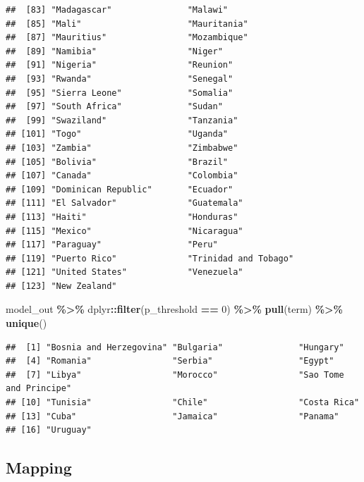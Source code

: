 \documentclass[
]{book}
\newenvironment{Shaded}{\begin{snugshade}}{\end{snugshade}}
\newcommand{\DecValTok}[1]{\textcolor[rgb]{0.00,0.00,0.81}{#1}}
\newcommand{\FunctionTok}[1]{\textcolor[rgb]{0.13,0.29,0.53}{\textbf{#1}}}
\newcommand{\NormalTok}[1]{#1}
\newcommand{\SpecialCharTok}[1]{\textcolor[rgb]{0.81,0.36,0.00}{\textbf{#1}}}
\begin{document}
\begin{verbatim}
##  [83] "Madagascar"               "Malawi"                  
##  [85] "Mali"                     "Mauritania"              
##  [87] "Mauritius"                "Mozambique"              
##  [89] "Namibia"                  "Niger"                   
##  [91] "Nigeria"                  "Reunion"                 
##  [93] "Rwanda"                   "Senegal"                 
##  [95] "Sierra Leone"             "Somalia"                 
##  [97] "South Africa"             "Sudan"                   
##  [99] "Swaziland"                "Tanzania"                
## [101] "Togo"                     "Uganda"                  
## [103] "Zambia"                   "Zimbabwe"                
## [105] "Bolivia"                  "Brazil"                  
## [107] "Canada"                   "Colombia"                
## [109] "Dominican Republic"       "Ecuador"                 
## [111] "El Salvador"              "Guatemala"               
## [113] "Haiti"                    "Honduras"                
## [115] "Mexico"                   "Nicaragua"               
## [117] "Paraguay"                 "Peru"                    
## [119] "Puerto Rico"              "Trinidad and Tobago"     
## [121] "United States"            "Venezuela"               
## [123] "New Zealand"
\end{verbatim}

\begin{Shaded}
\begin{Highlighting}[]
\NormalTok{model\_out }\SpecialCharTok{\%\textgreater{}\%}
\NormalTok{  dplyr}\SpecialCharTok{::}\FunctionTok{filter}\NormalTok{(p\_threshold }\SpecialCharTok{==} \DecValTok{0}\NormalTok{) }\SpecialCharTok{\%\textgreater{}\%}
  \FunctionTok{pull}\NormalTok{(term) }\SpecialCharTok{\%\textgreater{}\%}
  \FunctionTok{unique}\NormalTok{()}
\end{Highlighting}
\end{Shaded}

\begin{verbatim}
##  [1] "Bosnia and Herzegovina" "Bulgaria"               "Hungary"               
##  [4] "Romania"                "Serbia"                 "Egypt"                 
##  [7] "Libya"                  "Morocco"                "Sao Tome and Principe" 
## [10] "Tunisia"                "Chile"                  "Costa Rica"            
## [13] "Cuba"                   "Jamaica"                "Panama"                
## [16] "Uruguay"
\end{verbatim}

\subsection{Mapping}\label{mapping}
\end{document}
